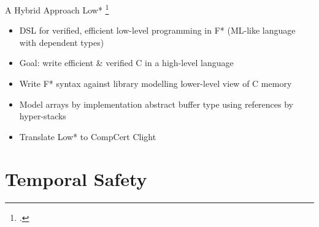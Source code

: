 \documentclass[aspectratio=169]{beamer}
\begin{document}
\begin{frame}{A Hybrid Approach}
Low* \footcite{footcite:protzenko_verified_2017}
\begin{itemize}
    \item DSL for verified, efficient low-level programming in F* (ML-like language with dependent types)
    \item Goal: write efficient \& verified C in a high-level language
    \item Write F* syntax against library modelling lower-level view of C memory
    \item Model arrays by implementation abstract buffer type using references by hyper-stacks
    \item Translate Low* to CompCert Clight
\end{itemize}
\end{frame}


\section{Temporal Safety}
\end{document}
